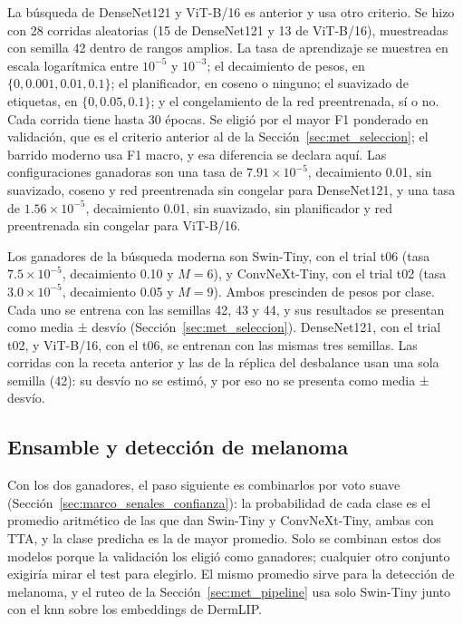 La búsqueda de DenseNet121 y ViT-B/16 es anterior y usa otro criterio. Se hizo con 28 corridas aleatorias (15 de DenseNet121
y 13 de ViT-B/16), muestreadas con semilla 42 dentro de rangos amplios. La tasa de aprendizaje se muestrea en escala
logarítmica entre $10^{-5}$ y $10^{-3}$; el decaimiento de pesos, en $\{0, 0.001, 0.01, 0.1\}$; el planificador, en coseno o
ninguno; el suavizado de etiquetas, en $\{0, 0.05, 0.1\}$; y el congelamiento de la red preentrenada, sí o no. Cada corrida tiene hasta
30 épocas. Se eligió por el mayor F1 ponderado en validación, que es el criterio anterior al de la
Sección~\ref{sec:met_seleccion}; el barrido moderno usa F1 macro, y esa diferencia se declara aquí. Las configuraciones
ganadoras son una tasa de $7.91 \times 10^{-5}$, decaimiento 0.01, sin suavizado, coseno y red preentrenada sin congelar para
DenseNet121, y una tasa de $1.56 \times 10^{-5}$, decaimiento 0.01, sin suavizado, sin planificador y red preentrenada sin congelar
para ViT-B/16.

Los ganadores de la búsqueda moderna son Swin-Tiny, con el trial t06 (tasa $7.5 \times 10^{-5}$, decaimiento 0.10 y $M = 6$),
y ConvNeXt-Tiny, con el trial t02 (tasa $3.0 \times 10^{-5}$, decaimiento 0.05 y $M = 9$). Ambos prescinden de pesos por
clase. Cada uno se entrena con las semillas 42, 43 y 44, y sus resultados se presentan como media ± desvío
(Sección~\ref{sec:met_seleccion}). DenseNet121, con el trial t02, y ViT-B/16, con el t06, se entrenan con las mismas tres
semillas. Las corridas con la receta anterior y las de la réplica del desbalance usan una sola semilla (42): su desvío no se
estimó, y por eso no se presenta como media ± desvío.

\subsection{Ensamble y detección de melanoma}
\label{sec:met_supervisados_ensamble}

Con los dos ganadores, el paso siguiente es combinarlos por voto suave (Sección~\ref{sec:marco_senales_confianza}): la
probabilidad de cada clase es el promedio aritmético de las que dan Swin-Tiny y ConvNeXt-Tiny, ambas con TTA, y la clase
predicha es la de mayor promedio. Solo se combinan estos dos modelos porque la validación los eligió como ganadores;
cualquier otro conjunto exigiría mirar el test para elegirlo. El mismo promedio sirve para la detección de melanoma, y el
ruteo de la Sección~\ref{sec:met_pipeline} usa solo Swin-Tiny junto con el \gls{knn} sobre los embeddings de DermLIP.

